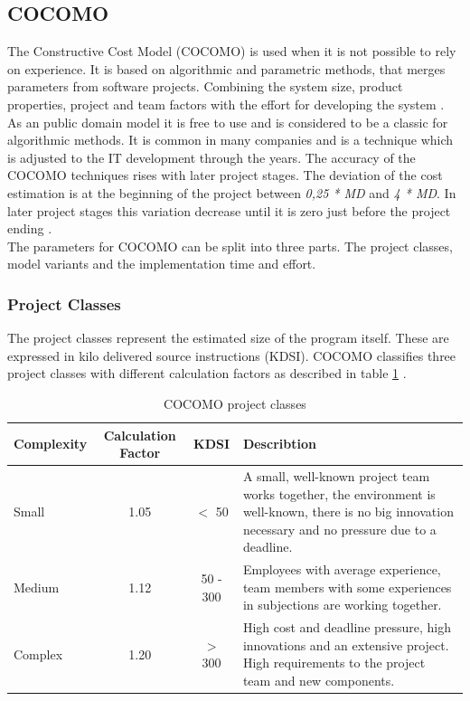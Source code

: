 \subsection{COCOMO} \label{COCOMOMethod}

The Constructive Cost Model (COCOMO) is used when it is not possible to rely on experience. It is based on algorithmic and parametric methods, that merges parameters from software projects. Combining the system size, product properties, project and team factors with the effort for developing the system \cite{jenny}.\\
As an public domain model it is free to use and is considered to be a classic for algorithmic methods. It is common in many companies and is a technique which is adjusted to the IT development through the years.
The accuracy of the COCOMO techniques rises with later project stages. The deviation of the cost estimation is at the beginning of the project between \textit{0,25 * MD} and \textit{4 * MD}. In later project stages this variation decrease until it is zero just before the project ending \cite{sommerville}.\\
The parameters for COCOMO can be split into three parts. The project classes, model variants and the implementation time and effort.

\subsubsection{Project Classes}

The project classes represent the estimated size of the program itself. These are expressed in kilo delivered source instructions (KDSI). COCOMO classifies three project classes with different calculation factors as described in table \ref{tab:projectclasses} \cite{sommerville}.

\begin{table}[h]
	\centering 
	\setlength{\tabcolsep}{4pt}
	\begin{tabular}{|l||c|c|p{6cm}|}\hline
		Complexity	& Calculation Factor& KDSI 	& Describtion\\ \hline\hline
		Small   	& 1.05        		& $<$ 50  			& A small, well-known project team works together, the environment is well-known, there is no big innovation necessary and no pressure due to a deadline.\\ \hline
		Medium 		& 1.12        		& 50 - 300 			& Employees with average experience, team members with some experiences in subjections are working together.  \\ \hline
		Complex 	& 1.20 				& $>$ 300 			& High cost and deadline pressure, high innovations and an extensive project. High requirements to the project team and new components.  \\ \hline
	\end{tabular} 
	\caption{COCOMO project classes} 
	\label{tab:projectclasses} 
\end{table}

